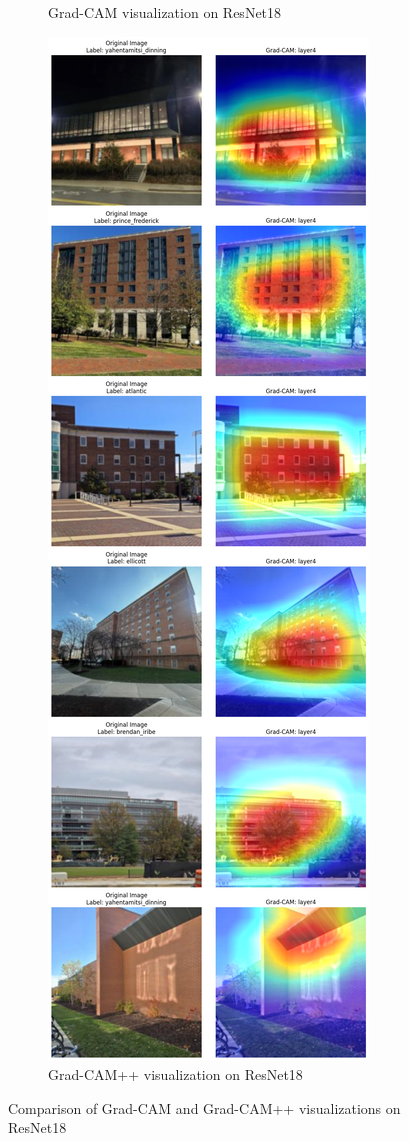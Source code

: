 \documentclass{article}
\begin{document}
\begin{figure}[H]
\begin{subfigure}[b]{0.45\linewidth}
        \caption{Grad-CAM visualization on ResNet18}
        \label{fig:gradcam1}
    \end{subfigure}
    \hfill  %
    \begin{subfigure}[b]{0.45\linewidth}
        \centering
        \includegraphics[width=\linewidth]{new_gradcam_plusplus_result2.png}
        \caption{Grad-CAM++ visualization on ResNet18}
        \label{fig:gradcam2}
    \end{subfigure}

    \caption{Comparison of Grad-CAM and Grad-CAM++ visualizations on ResNet18}
    \label{fig:gradcam_comparison1}
\end{figure}
\end{document}
